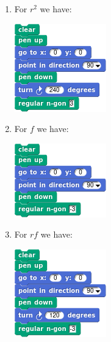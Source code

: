\documentclass[noauthor,nooutcomes,hints,handout]{ximera}
\begin{document}
\begin{question}
\begin{freeResponse}
\begin{enumerate}
\begin{center}
      \end{center}
    \item For $r^2$ we have:
      \begin{center}
        \includegraphics[width=.3\textwidth]{r2TriSCRIPT.png}   \qquad {}
      \end{center}
    \item For $f$ we have:
      \begin{center}
        \includegraphics[width=.3\textwidth]{fTriSCRIPT.png}   \qquad {}
      \end{center}
    \item For $rf$ we have:
      \begin{center}
        \includegraphics[width=.3\textwidth]{rfTriSCRIPT.png}   \qquad {}

\end{center}
\end{enumerate}
\end{freeResponse}
\end{question}
\end{document}
